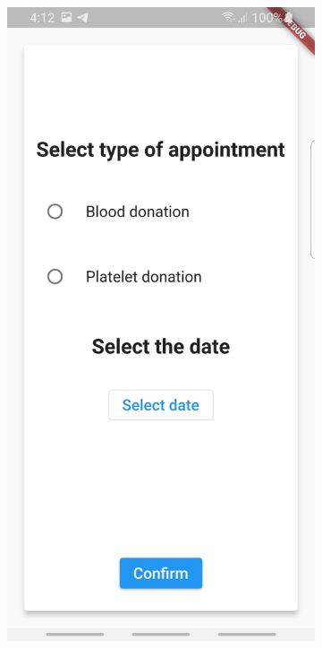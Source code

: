 \begin{figure}
\begin{subfigure}{.31\textwidth}
  \centering
  \includegraphics[width=1\linewidth]{images1/quess5.jpg}  

\end{subfigure}
\end{figure}

